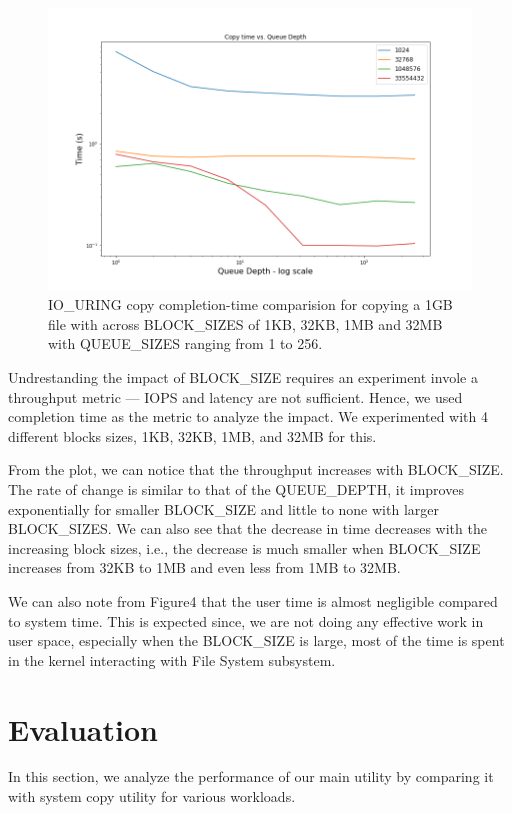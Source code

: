 \documentclass{article}
\begin{document}
\begin{figure}
    \centering
    \includegraphics[scale = 0.4]{cp_qd.png}
    \caption{IO\_URING copy completion-time comparision for copying a 1GB file with across BLOCK\_SIZES 
    of 1KB, 32KB, 1MB and 32MB with QUEUE\_SIZES ranging from 1 to 256.}
    \label{Figure4}
\end{figure}

Undrestanding the impact of BLOCK\_SIZE requires an experiment invole a throughput metric — IOPS and latency are not sufficient. 
Hence, we used completion time as the metric to analyze the impact. We experimented with 4 different blocks sizes, 1KB, 32KB, 
1MB, and 32MB for this.

From the plot, we can notice that the throughput increases with BLOCK\_SIZE. The rate of change is similar to that of the 
QUEUE\_DEPTH, it improves exponentially for smaller BLOCK\_SIZE and little to none with larger BLOCK\_SIZES. We can also see that 
the decrease in time decreases with the increasing block sizes, i.e., the decrease is much smaller when BLOCK\_SIZE increases 
from 32KB to 1MB and even less from 1MB to 32MB.

We can also note from Figure4 that the user time is almost negligible compared to system time. This is expected since, we are 
not doing any effective work in user space, especially when the BLOCK\_SIZE is large, most of the time is spent in the kernel 
interacting with File System subsystem. 

\section{Evaluation}
In this section, we analyze the performance of our main utility by comparing it with system copy utility for various workloads.
\end{document}
